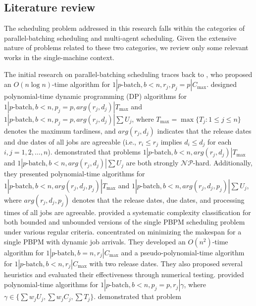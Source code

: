 \documentclass[12pt]{article}
\begin{document}
\begin{sloppypar}
\subsection{Literature review}

The scheduling problem addressed in this research falls within the categories of parallel-batching scheduling and multi-agent scheduling. Given the extensive nature of problems related to these two categories, we review only some relevant works in the single-machine context.  

The initial research on parallel-batching scheduling traces back to \cite{IkuraGimple1986ORL}, who proposed an $O(n \log n)$-time algorithm for $1 | p\text{-batch}, b < n, r_j, p_j=p| C_{\max}$. \cite{LeeUzsoy1992OR} designed polynomial-time dynamic programming (DP) algorithms for $1 | p\text{-batch}, b < n, p_j=p, arg(r_j, d_j)| T_{\max}$ and $1 | p\text{-batch}, b < n, p_j=p, arg(r_j, d_j)| \sum U_j$, where $T_{\max}=\max\{T_j: 1 \leq j \leq n\}$ denotes the maximum tardiness, and $arg(r_j, d_j)$ indicates that the release dates and due dates of all jobs are agreeable (i.e., $r_i \leq r_j$ implies $d_i \leq d_j$ for each $i, j =1, 2, \ldots, n$). \cite{LiLee1997EJOR} demonstrated that problems $1 | p\text{-batch}, b < n, arg(r_j, d_j)| T_{\max}$ and $1 | p\text{-batch}, b < n, arg(r_j, d_j)| \sum U_j$ are both strongly $\mathcal{NP}$-hard. Additionally, they presented polynomial-time algorithms for $1 | p\text{-batch}, b < n, arg(r_j, d_j, p_j)| T_{\max}$ and $1 | p\text{-batch}, b < n, arg(r_j, d_j, p_j)| \sum U_j$, where $arg(r_j, d_j, p_j)$ denotes that the release dates, due dates, and processing times of all jobs are agreeable. \cite{Brucker1998JOS} provided a systematic complexity classification for both bounded and unbounded versions of the single PBPM scheduling problem under various regular criteria. \cite{LeeUzsoy1999IJPR} concentrated on minimizing the makespan for a single PBPM with dynamic job arrivals. They developed an $O(n^2)$-time algorithm for $1 | p\text{-batch}, b = n, r_j| C_{\max}$ and a pseudo-polynomial-time algorithm for $1 | p\text{-batch}, b < n, r_j| C_{\max}$ with two release dates. They also proposed several heuristics and evaluated their effectiveness through numerical testing. \cite{Baptiste2000MMOR} provided polynomial-time
algorithms for $1 | p\text{-batch}, b < n, p_j=p, r_j| \gamma$, where $\gamma \in \{\sum w_j U_j, \sum w_j C_j, \sum T_j\}$. \cite{ChengLiuYU2001IIE} demonstrated that problem

\end{sloppypar}
\end{document}
